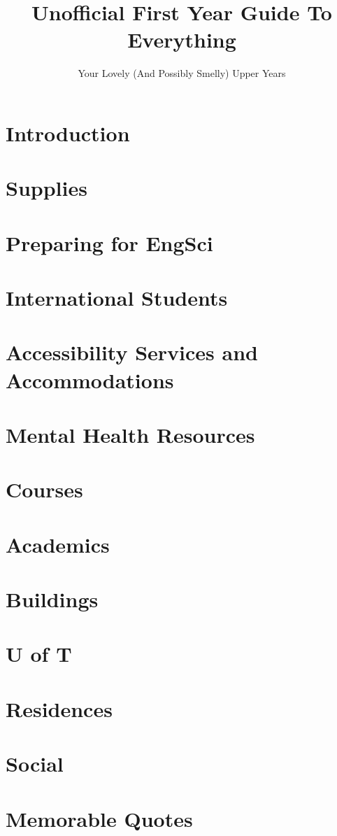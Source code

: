 \documentclass[12pt]{report}
\author{Your Lovely (And Possibly Smelly) Upper Years}
\title{Unofficial First Year Guide To Everything}
\begin{document}
\maketitle
\tableofcontents

\chapter{Introduction}

\chapter{Supplies}


\chapter{Preparing for EngSci}


\chapter{International Students}


\chapter{Accessibility Services and Accommodations}


\chapter{Mental Health Resources}


\chapter{Courses}


\chapter{Academics}


\chapter{Buildings}


\chapter{U of T}


\chapter{Residences}


\chapter{Social}


\chapter{Memorable Quotes}

\end{document}
